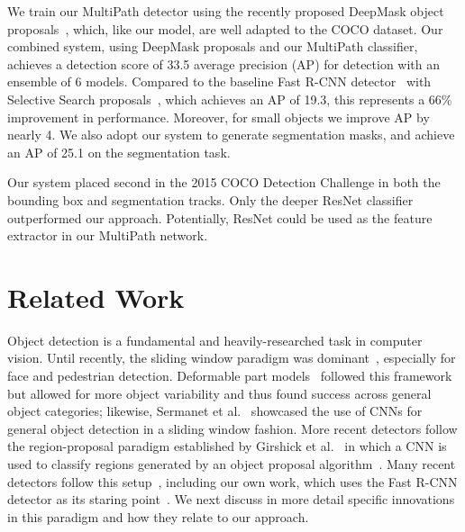 \documentclass{bmvc2k}
\begin{document}
We train our MultiPath detector using the recently proposed DeepMask object proposals~\cite{pinheiro2015learning, pinheiro2016refining}, which, like our model, are well adapted to the COCO dataset. Our combined system, using DeepMask proposals and our MultiPath classifier, achieves a detection score of 33.5 average precision (AP) for detection with an ensemble of 6 models. Compared to the baseline Fast R-CNN detector~\cite{girshick15fastrcnn} with Selective Search proposals~\cite{Uijlings13}, which achieves an AP of 19.3, this represents a 66\% improvement in performance. Moreover, for small objects we improve AP by nearly 4. We also adopt our system to generate segmentation masks, and achieve an AP of 25.1 on the segmentation task.

Our system placed second in the 2015 COCO Detection Challenge in both the bounding box and segmentation tracks. Only the deeper ResNet classifier~\cite{he2015deep} outperformed our approach. Potentially, ResNet could be used as the feature extractor in our MultiPath network.

\section{Related Work}

Object detection is a fundamental and heavily-researched task in computer vision. Until recently, the sliding window paradigm was dominant~\cite{Viola2004, DollarPAMI14pyramids}, especially for face and pedestrian detection. Deformable part models~\cite{Felzenszwalb2010} followed this framework but allowed for more object variability and thus found success across general object categories; likewise, Sermanet et al.~\cite{SermanetICLR2013, sermanetCVPR2013} showcased the use of CNNs for general object detection in a sliding window fashion. More recent detectors follow the region-proposal paradigm established by Girshick et al.~\cite{Girshick2014rcnn} in which a CNN is used to classify regions generated by an object proposal algorithm~\cite{Hosang2015proposals}. Many recent detectors follow this setup~\cite{gidaris2015object, Szegedy15, He2014sppNet, Girshick2014rcnn, girshick15fastrcnn, RenNIPS15fasterRCNN}, including our own work, which uses the Fast R-CNN detector as its staring point~\cite{girshick15fastrcnn}. We next discuss in more detail specific innovations in this paradigm and how they relate to our approach.
\end{document}
